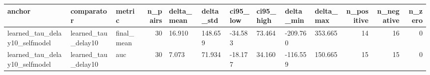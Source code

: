 \begin{tabular}{lllrllllllrrr}
\toprule
anchor & comparator & metric & n_pairs & delta_mean & delta_std & ci95_low & ci95_high & delta_min & delta_max & n_positive & n_negative & n_zero \\
\midrule
learned_tau_delay10_selfmodel & learned_tau_delay10 & final_mean & 30 & 16.910 & 148.659 & -34.583 & 73.464 & -209.760 & 353.665 & 14 & 16 & 0 \\
learned_tau_delay10_selfmodel & learned_tau_delay10 & auc & 30 & 7.073 & 71.934 & -18.177 & 34.160 & -116.559 & 150.665 & 15 & 15 & 0 \\
\bottomrule
\end{tabular}
